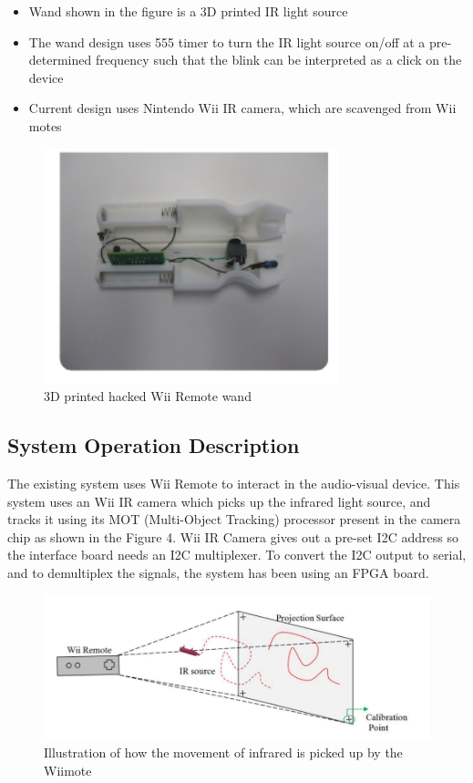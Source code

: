 \documentclass[12pt, a4paper]{article}
\begin{document}
\begin{itemize}
\item Wand shown in the figure is a 3D printed IR light source
\item The wand design uses 555 timer to turn the IR light source on/off at a pre-determined frequency such that the blink can be interpreted as a click on the device
\item Current design uses Nintendo Wii IR camera, which are scavenged from Wii motes
\end{itemize}
\begin{figure}[htp]
\centering
\includegraphics[scale=0.4]{wand1.png}
\caption{3D printed hacked Wii Remote wand}
\label{}
\end{figure}


\subsection{System Operation Description}
The existing system uses Wii Remote to interact in the audio-visual device. This system uses an Wii IR camera which picks up the infrared light source, and tracks it using its MOT (Multi-Object Tracking) processor present in the camera chip as shown in the Figure 4. Wii IR Camera gives out a pre-set I2C address so the interface board needs an I2C multiplexer. To convert the I2C output to serial, and to demultiplex the signals, the system has been using an FPGA board. 

\begin{figure}[htp]
\centering
\includegraphics[scale=0.35]{wiiiii.png}
\caption{Illustration of how the movement of infrared is picked up by the Wiimote}
\label{}
\end{figure}
\end{document}
